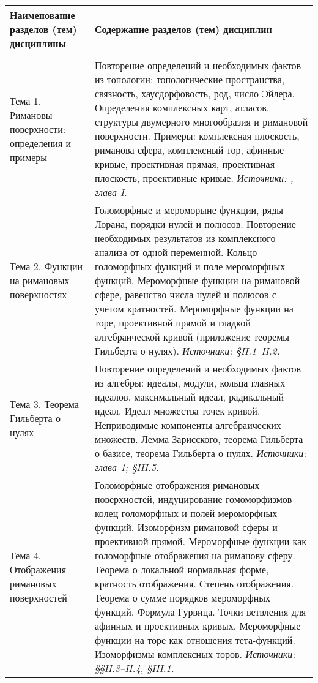 \documentclass[a4paper, 12pt]{article}
\begin{document}
\noindent
\begin{longtable}{ | >{\raggedright}p{5cm} | p{10cm} | } 
    \hline
    \textbf{Наименование разделов (тем) дисциплины} & \textbf{Содержание разделов (тем) дисциплин} \\
    \hline
    \hline
    \multicolumn{2}{|l|}{\textit{Раздел 1. Римановы поверхности}}\\ \hline
    Тема 1. Римановы поверхности: определения и примеры &
    Повторение определений и необходимых фактов из топологии: топологические пространства, связность, хаусдорфовость, род, число Эйлера. Определения комплексных карт, атласов, структуры двумерного многообразия и римановой поверхности. Примеры: комплексная плоскость, риманова сфера, комплексный тор, афинные кривые, проективная прямая, проективная плоскость, проективные кривые.
    \textit{Источники: \cite{Mir}, глава I.} \\ \hline
    Тема 2. Функции на римановых поверхностях & Голоморфные и мероморыне функции, ряды Лорана, порядки нулей и полюсов. Повторение необходимых результатов из комплексного анализа от одной переменной. Кольцо голоморфных функций и поле мероморфных функций. Мероморфные функции на римановой сфере, равенство числа нулей и полюсов с учетом кратностей. Мероморфные функции на торе, проективной прямой и гладкой алгебраической кривой (приложение теоремы Гильберта о нулях).
    \textit{Источники: \cite{Mir} \S II.1--II.2.} \\ \hline
    Тема 3. Теорема Гильберта о нулях & Повторение определений и необходимых фактов из алгебры: идеалы, модули, кольца главных идеалов, максимальный идеал, радикальный идеал. Идеал множества точек кривой. Неприводимые компоненты алгебраических множеств. Лемма Зарисского, теорема Гильберта о базисе, теорема Гильберта о нулях.
    \textit{Источники: \cite{Fult} глава 1; \cite{Mir} \S III.5.} \\ \hline
    Тема 4. Отображения римановых поверхностей & Голоморфные отображения римановых поверхностей, индуцирование гомоморфизмов колец голоморфных и полей мероморфных функций. Изоморфизм римановой сферы и проективной прямой. Мероморфные функции как голоморфные отображения на риманову сферу. Теорема о локальной нормальная форме, кратность отображения. Степень отображения. Теорема о сумме порядков мероморфных функций. Формула Гурвица. Точки ветвления для афинных и проективных кривых. Мероморфные функции на торе как отношения тета-функций. Изоморфизмы комплексных торов.
    \textit{Источники: \cite{Mir} \S\S II.3--II.4, \S III.1.} \\ \hline

\end{longtable}
\end{document}
